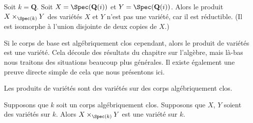 \begin{example}
\label{example-product-not-a-variety}
Soit $k = \mathbf{Q}$. Soit $X =
\Spec(\mathbf{Q}(i))$ et $Y = \Spec(\mathbf{Q}(i))$.
Alors le produit $X \times_{\Spec(k)} Y$ des variétés $X$
et $Y$ n'est pas une variété, car il est réductible. (Il
est isomorphe à l'union disjointe de deux copies de $X$.)
\end{example}

\noindent
Si le corps de base est algébriquement clos cependant, alors le produit de
variétés est une variété. Cela découle des résultats du chapitre sur
l'algèbre, mais là-bas nous traitons des situations beaucoup plus générales.
Il existe également une preuve directe simple de cela que nous présentons ici.

\begin{lemma}
\label{lemma-product-varieties}
\begin{slogan}
Les produits de variétés sont des variétés sur des corps algébriquement clos.
\end{slogan}
Supposons que $k$ soit un corps algébriquement clos.
Supposons que $X$, $Y$ soient des variétés sur $k$.
Alors $X \times_{\Spec(k)} Y$ est une variété sur $k$.
\end{lemma}

